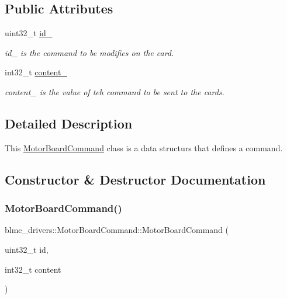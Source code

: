 \subsection*{Public Attributes}
\begin{DoxyCompactItemize}
\item 
\mbox{\label{classblmc__drivers_1_1MotorBoardCommand_a31bfcc3cb1b2c35cbd5349123d884af4}} 
uint32\+\_\+t \hyperlink{classblmc__drivers_1_1MotorBoardCommand_a31bfcc3cb1b2c35cbd5349123d884af4}{id\+\_\+}
\begin{DoxyCompactList}\small\item\em id\+\_\+ is the command to be modifies on the card. \end{DoxyCompactList}\item 
\mbox{\label{classblmc__drivers_1_1MotorBoardCommand_ac417b63a8cc8801a6757f4dce3b0810c}} 
int32\+\_\+t \hyperlink{classblmc__drivers_1_1MotorBoardCommand_ac417b63a8cc8801a6757f4dce3b0810c}{content\+\_\+}
\begin{DoxyCompactList}\small\item\em content\+\_\+ is the value of teh command to be sent to the cards. \end{DoxyCompactList}\end{DoxyCompactItemize}


\subsection{Detailed Description}
This \hyperlink{classblmc__drivers_1_1MotorBoardCommand}{Motor\+Board\+Command} class is a data structurs that defines a command. 

\subsection{Constructor \& Destructor Documentation}
\mbox{\label{classblmc__drivers_1_1MotorBoardCommand_ae7cf695d2600d84929729befc3cb29f9}} 
\subsubsection{\texorpdfstring{Motor\+Board\+Command()}{MotorBoardCommand()}}
{\footnotesize\ttfamily blmc\+\_\+drivers\+::\+Motor\+Board\+Command\+::\+Motor\+Board\+Command (\begin{DoxyParamCaption}\item[{uint32\+\_\+t}]{id,  }\item[{int32\+\_\+t}]{content }\end{DoxyParamCaption})\hspace{0.3cm}{\ttfamily [inline]}}



